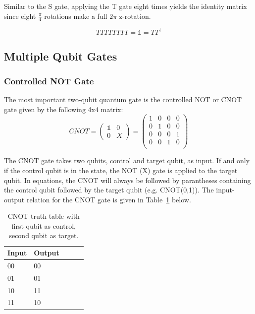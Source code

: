 Similar to the S gate, applying the T gate eight times yields the identity matrix since eight $\frac{\pi}{4}$ rotations make a full $2\pi$ z-rotation.

\begin{equation}
TTTTTTTT = \mathbb{1} = TT^\dagger
\end{equation}



\subsection{Multiple Qubit Gates}
\label{subsubsec:multiqubitgates}

\subsubsection{Controlled NOT Gate}
\label{subsubsubsec:cnotgate}

The most important two-qubit quantum gate is the controlled NOT or CNOT gate given by the following 4x4 matrix:
\begin{equation}
CNOT = \begin{pmatrix}
 \mathbb{1} & 0 \\ 
 0 & X
 \end{pmatrix} = \begin{pmatrix}
 1 & 0 & 0 & 0 \\ 
 0 & 1 & 0 & 0 \\
 0 & 0 & 0 & 1 \\
 0 & 0 & 1 & 0 \\
 \end{pmatrix}
\end{equation}

The CNOT gate takes two qubits, control and target qubit, as input. If and only if the control qubit is in the \1 state, the NOT (X) gate is applied to the target qubit. In equations, the CNOT will always be followed by parantheses containing the control qubit followed by the target qubit (e.g. CNOT(0,1)). The input-output relation for the CNOT gate is given in Table~\ref{tab:cnottruthtable} below.

\begin{table}[ht!]
\begin{center}
\caption{CNOT truth table with first qubit as control, second qubit as target.}\vspace{1ex}
\label{tab:cnottruthtable}
\begin{tabular}{llccc}\hline
Input & Output \\ \hline
00 & 00 \\
01 & 01 \\
10 & 11 \\
11 & 10 \\ \hline
\end{tabular}
\end{center}
\end{table}

